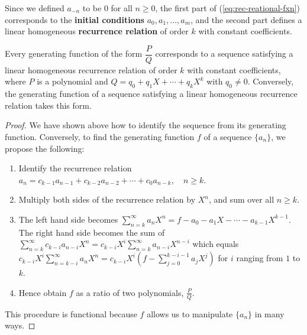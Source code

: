 \documentclass[a4paper, 12pt]{report}
\begin{document}
Since we defined $a_{-n}$ to be $0$ for all $n \geq 0$, the first part of (\ref{eq:rec-reational-fxn}) corresponds to the \textbf{initial conditions} $a_0, a_1, \dots, a_m$, and the second part defines a linear homogeneous \textbf{recurrence relation} of order $k$ with constant coefficients.

\begin{thm}\label{thm:gf-to-linrec}
Every generating function of the form $\dfrac{P}{Q}$ corresponds to a sequence satisfying a linear homogeneous recurrence relation of order $k$ with constant coefficients, where $P$ is a polynomial and $Q = q_0 + q_1 X + \cdots + q_k X^k$ with $q_0 \neq 0$. Conversely, the generating function of a sequence satisfying a linear homogeneous recurrence relation takes this form.
\end{thm}
\begin{proof}
We have shown above how to identify the sequence from its generating function. Conversely, to find the generating function $f$ of a sequence $\{a_n\}$, we propose the following:

\begin{enumerate}\vspace{-0.1cm}
    \item Identify the recurrence relation $a_n = c_{k - 1} a_{n - 1} + c_{k - 2} a_{n - 2} + \cdots + c_0 a_{n - k}, \quad n \geq k$.\vspace{-0.125cm}
    \item Multiply both sides of the recurrence relation by $X^n$, and sum over all $n \geq k$.\vspace{-0.125cm}
    \item The left hand side becomes $\sum_{n = k}^{\infty} a_n X^n = f - a_0 - a_1 X - \cdots - a_{k - 1} X^{k - 1}$. The right hand side becomes the sum of $\sum_{n=k}^\infty c_{k - i} a_{n - i} X^n = c_{k - i} X^i \sum_{n = k}^\infty a_{n - i} X^{n - i}$ which equals $c_{k - i} X^i \sum_{n = k - i}^\infty a_n X^n = c_{k - i} X^i (f - \sum_{j = 0}^{k - i - 1} a_{j} X^j )$ for $i$ ranging from $1$ to $k$. \vspace{-0.125cm}
    \item Hence obtain $f$ as a ratio of two polynomials, $\frac{P}{Q}$.\vspace{-0.125cm}
\end{enumerate}

This procedure is functional because $f$ allows us to manipulate $\{a_n\}$ in many ways.
\end{proof}
\end{document}
